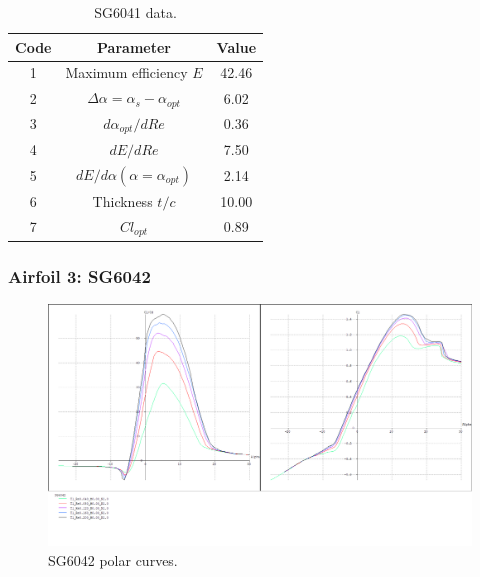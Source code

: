 \documentclass[../TFG_Annex.tex]{subfiles}
\begin{document}
\begin{table}[h!]
	\centering
	\begin{tabular}{c|c|c}
		Code & Parameter                                    & Value  \\ \hline
		1    & Maximum efficiency $E$                      &      42.46           \\
		2    & $\Delta \alpha=\alpha_{s}-\alpha_{opt}$    &            6.02         \\
		3    & ${d\alpha_{opt}}/{dRe}$                     &               0.36    \\
		4    & ${dE}/{dRe}$                                &          7.50          \\
		5    & ${dE}/{d \alpha} (\alpha=\alpha_{opt})$      &        2.14          \\
		6    & Thickness $t/c$                            &           10.00         \\
		7    & $Cl_{opt}$  & 0.89
	\end{tabular}
	\caption{SG6041 data.}
	\label{tab:Airf2}
\end{table}



\newpage
\subsubsection{Airfoil 3: SG6042}


\begin{figure}[h!]
	\centering
	\includegraphics[width=1\linewidth]{"../../04-Airfoil selection/Imatges airfoils/3-SG6042"}
	\caption{SG6042 polar curves.}
	\label{fig:3-sg6042}
\end{figure}
\end{document}
